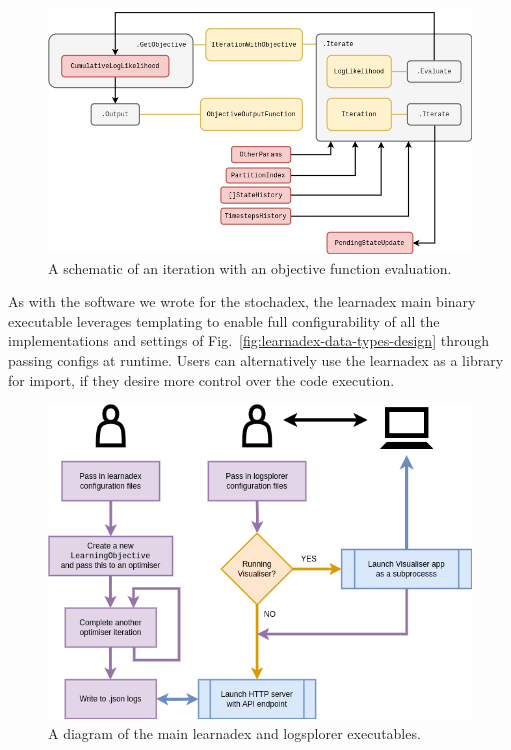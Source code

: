 \begin{figure}[h]
\centering
\includegraphics[width=14cm]{images/chapter-3-learnadex-data-iterator.drawio.png}
\caption{A schematic of an iteration with an objective function evaluation.}
\label{fig:learnadex-data-iterator}
\end{figure}

As with the software we wrote for the stochadex, the learnadex main binary executable leverages templating to enable full configurability of all the implementations and settings of Fig.~\ref{fig:learnadex-data-types-design} through passing configs at runtime. Users can alternatively use the learnadex as a library for import, if they desire more control over the code execution. 

\begin{figure}[h]
\centering
\includegraphics[width=13cm]{images/chapter-3-learnadex-main.drawio.png}
\caption{A diagram of the main learnadex and logsplorer executables.}
\label{fig:learnadex-main}
\end{figure}
    
